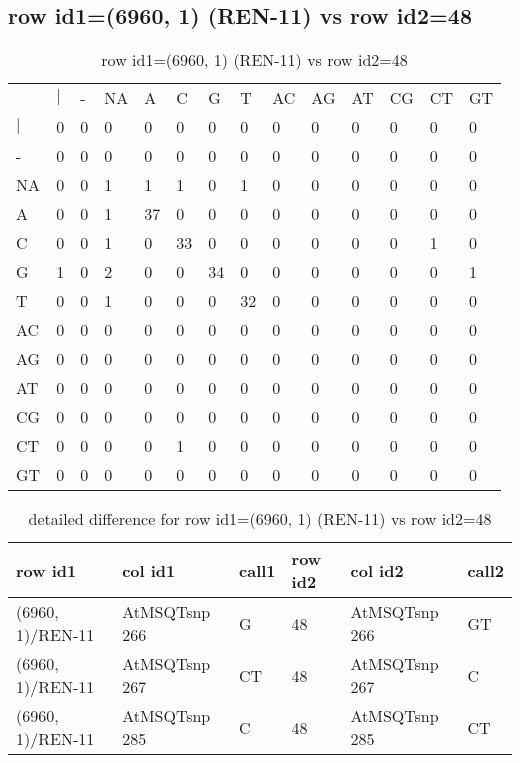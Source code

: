 \subsection{row id1=(6960, 1) (REN-11) vs row id2=48}
\begin{center}
\begin{longtable}{|l|l|l|l|l|l|l|l|l|l|l|l|l|l|}
\caption{row id1=(6960, 1) (REN-11) vs row id2=48} \label{table_dm170}\\
\hline
\\
\hline
&$|$&-&NA&A&C&G&T&AC&AG&AT&CG&CT&GT\\
$|$&0&0&0&0&0&0&0&0&0&0&0&0&0\\
-&0&0&0&0&0&0&0&0&0&0&0&0&0\\
NA&0&0&1&1&1&0&1&0&0&0&0&0&0\\
A&0&0&1&37&0&0&0&0&0&0&0&0&0\\
C&0&0&1&0&33&0&0&0&0&0&0&1&0\\
G&1&0&2&0&0&34&0&0&0&0&0&0&1\\
T&0&0&1&0&0&0&32&0&0&0&0&0&0\\
AC&0&0&0&0&0&0&0&0&0&0&0&0&0\\
AG&0&0&0&0&0&0&0&0&0&0&0&0&0\\
AT&0&0&0&0&0&0&0&0&0&0&0&0&0\\
CG&0&0&0&0&0&0&0&0&0&0&0&0&0\\
CT&0&0&0&0&1&0&0&0&0&0&0&0&0\\
GT&0&0&0&0&0&0&0&0&0&0&0&0&0\\
\hline
\end{longtable}
\end{center}

\begin{center}
\begin{longtable}{|l|l|l|l|l|l|}
\caption{detailed difference for row id1=(6960, 1) (REN-11) vs row id2=48} \label{table_dm171}\\
\hline
row id1&col id1&call1&row id2&col id2&call2\\
\hline
(6960, 1)/REN-11&AtMSQTsnp 266&G&48&AtMSQTsnp 266&GT\\
(6960, 1)/REN-11&AtMSQTsnp 267&CT&48&AtMSQTsnp 267&C\\
(6960, 1)/REN-11&AtMSQTsnp 285&C&48&AtMSQTsnp 285&CT\\
\hline
\end{longtable}
\end{center}

